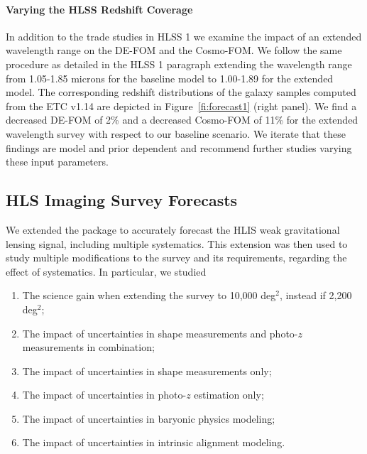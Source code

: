 
\paragraph{Varying the HLSS Redshift Coverage} In addition to the trade studies in HLSS 1 we examine the impact of an extended wavelength range on the DE-FOM and the Cosmo-FOM. We follow the same procedure as detailed in the HLSS 1 paragraph extending the wavelength range from 1.05-1.85 microns for the baseline model to 1.00-1.89 for the extended model. The corresponding redshift distributions of the galaxy samples computed from the ETC v1.14 are depicted in  Figure~\ref{fi:forecast1} (right panel). We find a decreased DE-FOM of 2\% and a decreased Cosmo-FOM of 11\% for the extended wavelength survey with respect to our baseline scenario. We iterate that these findings are model and prior dependent and recommend further studies varying these input parameters.

\subsection{HLS Imaging Survey Forecasts}
\label{sec:HLISforecasts}

\begin{summaryii}
We extended the \CoLi package to accurately forecast the HLIS weak gravitational lensing signal, including multiple systematics. This extension was then used to study multiple modifications to the survey and its requirements, regarding the effect of systematics. In particular, we studied
\begin{enumerate}
  \item The science gain when extending the survey to 10,000 deg$^2$, instead if 2,200 deg$^2$;
  \item The impact of uncertainties in shape measurements and photo-$z$ measurements in combination;
  \item The impact of uncertainties in shape measurements only;
  \item The impact of uncertainties in photo-$z$ estimation only;
  \item The impact of uncertainties in baryonic physics modeling;
  \item The impact of uncertainties in intrinsic alignment modeling.
\end{enumerate}
\end{summaryii}

